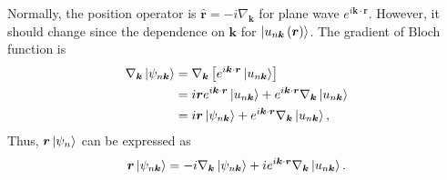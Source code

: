 \documentclass[12pt, oneside]{article}
\newcommand{\p}[1]{\left(#1\right)}
\newcommand{\bb}[1]{\left[#1\right]}
\numberwithin{equation}{subsection}
\begin{document}
Normally, the position operator is \(\hat{\bm{r}} = -i \nabla_{\bm{k}}\) for plane wave \(e^{i \bm{k} \cdot \bm{r}}\). However, it should change since the dependence on \(\bm{k}\) for \(\ket{u_{n \bm{k}} \p{\bm{r}}}\). The gradient of Bloch function is 
\begin{align}
	\begin{split}
		\nabla_{\bm{k}} \ket{\psi_{n \bm{k}}} &= \nabla_{\bm{k}} \bb{e^{i \bm{k} \cdot \bm{r}} \ket{u_{n \bm{k}}}} \\
		& = i \bm{r} e^{i \bm{k} \cdot \bm{r}}  \ket{u_{n \bm{k}}} + e^{i \bm{k} \cdot \bm{r}} \nabla_{\bm{k}}  \ket{u_{n \bm{k}} } \\
		& = i \bm{r} \ket{\psi_{n \bm{k}}} + e^{i \bm{k} \cdot \bm{r}} \nabla_{\bm{k}} \ket{u_{n \bm{k}}},
	\end{split}
\end{align}
Thus, \(\bm{r} \ket{\psi_{n}}\) can be expressed as 
\begin{align}
	\bm{r} \ket{\psi_{n \bm{k}}} = -i \nabla_{\bm{k}} \ket{\psi_{n \bm{k}}} + i e^{i \bm{k} \cdot \bm{r}} \nabla_{\bm{k}} \ket{u_{n \bm{k}}}.
\end{align} 
\end{document}

